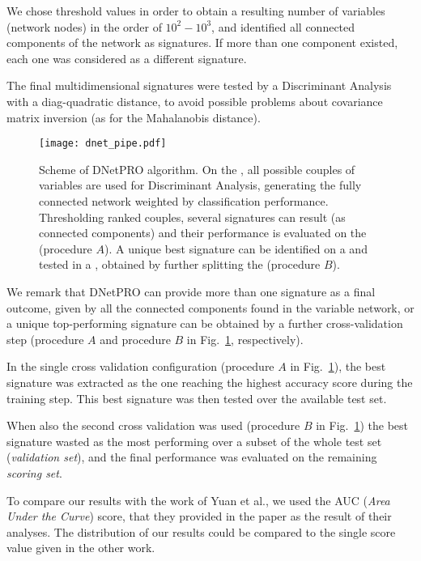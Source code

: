 \documentclass{standalone}
\begin{document}
We chose threshold values in order to obtain a resulting number of variables (network nodes) in the order of $10^2-10^3$, and identified all connected components of the network as signatures.
If more than one component existed, each one was considered as a different signature.

The final multidimensional signatures were tested by a Discriminant Analysis with a diag-quadratic distance, to avoid possible problems about covariance matrix inversion (as for the Mahalanobis distance).

\begin{center}
\begin{figure}[htbp]
\centering
\texttt{[image: dnet\_pipe.pdf]}
\caption{Scheme of DNetPRO algorithm.
On the , all possible couples of variables are used for Discriminant Analysis, generating the fully connected network weighted by classification performance.
Thresholding ranked couples, several signatures can result (as connected components) and their performance is evaluated on the  (procedure $A$).
A unique best signature can be identified on a  and tested in a , obtained by further splitting the  (procedure $B$).
}
\label{fig:dnet_pipe}
\end{figure}
\end{center}

We remark that DNetPRO can provide more than one signature as a final outcome, given by all the connected components found in the variable network, or a unique top-performing signature can be obtained by a further cross-validation step (procedure $A$ and procedure $B$ in Fig.~\ref{fig:dnet_pipe}, respectively).

In the single cross validation configuration (procedure $A$ in Fig.~\ref{fig:dnet_pipe}), the best signature was extracted as the one reaching the highest accuracy score during the training step.
This best signature was then tested over the available test set.

When also the second cross validation was used (procedure $B$ in Fig.~\ref{fig:dnet_pipe}) the best signature wasted as the most performing over a subset of the whole test set (\emph{validation set}), and the final performance was evaluated on the remaining \emph{scoring set}.

To compare our results with the work of Yuan et al., we used the AUC (\emph{Area Under the Curve}) score, that they provided in the paper as the result of their analyses.
The distribution of our results could be compared to the single score value given in the other work.
\end{document}
